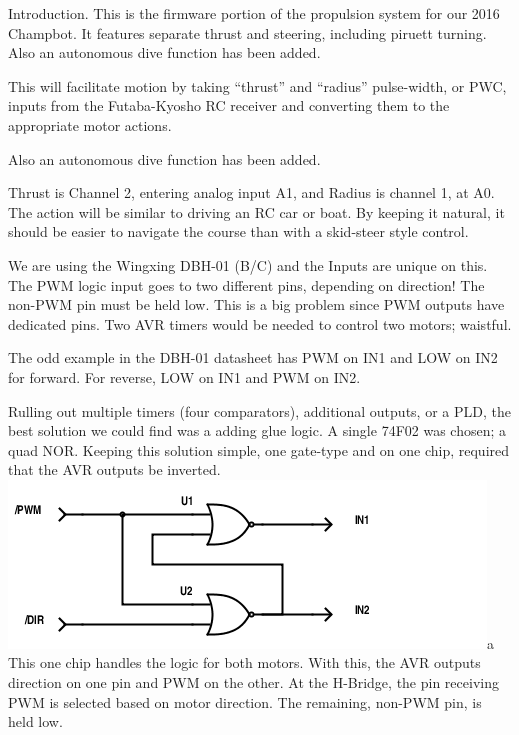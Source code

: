 

%



\nocon %
\datethis %


Introduction. This is the firmware portion of the propulsion system for
our
2016 Champbot.
It features separate thrust and steering, including piruett turning. Also an
autonomous dive function has been added.

This will facilitate motion by taking ``thrust'' and ``radius'' pulse-width,
or PWC, inputs from the Futaba-Kyosho RC receiver and converting them to the
appropriate motor actions.

Also an autonomous dive function has been added.


Thrust is Channel 2, entering analog input A1, and Radius is channel 1, at A0.
The action will be similar to driving an RC car or boat.
By keeping it natural, it should be easier to navigate the course than with a
skid-steer style control.

We are using the Wingxing DBH-01 (B/C) and the Inputs are unique on this.
The PWM logic input goes to two different pins, depending on direction!
The non-PWM pin must be held low.
This is a big problem since PWM outputs have dedicated pins.
Two AVR timers would be needed to control two motors; waistful.

The odd example in the DBH-01 datasheet has PWM on IN1 and LOW on IN2 for
forward. For reverse, LOW on IN1 and PWM on IN2.

Rulling out multiple timers (four comparators), additional outputs, or a PLD,
the best solution we could find was a adding glue logic.
A single 74F02 was chosen; a quad NOR.
Keeping this solution simple, one gate-type and on one chip, required that the
AVR outputs be inverted.
\includegraphics[width=25 pc]{glue.png}a
This one chip handles the logic for both motors. With this, the AVR outputs
direction on one pin and PWM on the other.
At the H-Bridge, the pin receiving PWM is selected based on motor direction.
The remaining, non-PWM pin, is held low.



